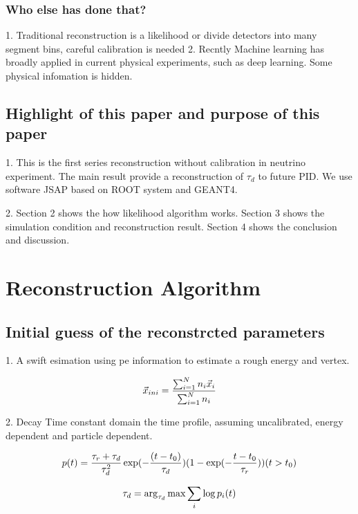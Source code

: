 \documentclass{article}
\begin{document}
\subsubsection{Who else has done that?}
1. Traditional reconstruction is a likelihood or divide detectors into many segment bins, careful calibration is needed
2. Recntly Machine learning has broadly applied in current physical experiments, such as deep learning. Some physical infomation is hidden.

\subsection{Highlight of this paper and purpose of this paper}
1. This is the first series reconstruction without calibration in neutrino experiment. The main result provide a reconstruction of $\tau_d$ to future PID. We use software JSAP based on ROOT system and GEANT4.

2. Section 2 shows the how likelihood algorithm works. Section 3 shows the simulation condition and reconstruction result. Section 4 shows the conclusion and discussion.

\section{Reconstruction Algorithm}
\subsection{Initial guess of the reconstrcted parameters}
1. A swift esimation using pe information to estimate a rough energy and vertex. 

    \begin{equation}
        \numberwithin{equation}{section}
        \vec{x}_{ini} = \frac{\sum_{i=1}^N n_i\vec{x}_i}{\sum_{i=1}^N n_i}
    \end{equation}

2. Decay Time constant domain the time profile, assuming uncalibrated, energy dependent and particle dependent.

    \begin{equation}
        \numberwithin{equation}{section}
        p(t) =  \frac{\tau_r+\tau_d}{\tau_d^2} \exp (-\frac{(t-t_0)}{\tau_d})(1-\exp(-\frac{t-t_0}{\tau_r})) (t > t_0)
    \end{equation}

    \begin{equation}
        \numberwithin{equation}{section}
        \tau_d = \arg_{\tau_d}\max{\sum_i \log p_i(t)}
    \end{equation}
\end{document}
